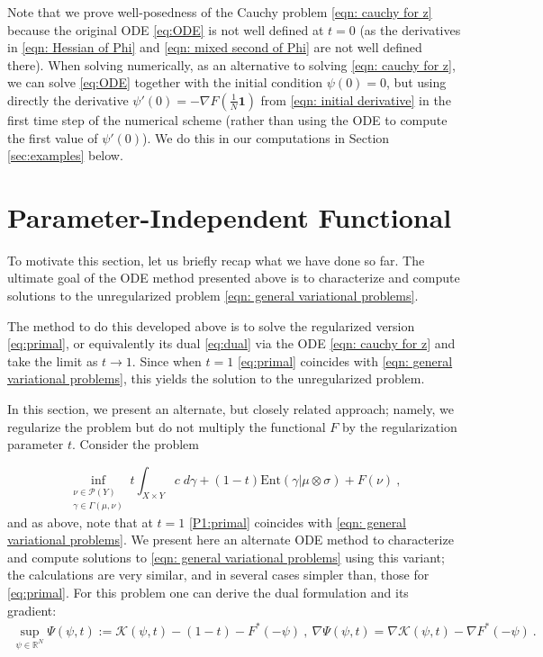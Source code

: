 \documentclass{scrartcl}
\newcommand{\R}{{\mathbb R}}
\theoremstyle{plain}
\theoremstyle{definition}
\begin{document}
Note that we prove well-posedness of the Cauchy problem \eqref{eqn: cauchy for z} because the original ODE \eqref{eq:ODE} is not well defined at $t=0$ (as the derivatives in \eqref{eqn: Hessian of Phi} and \eqref{eqn: mixed second of Phi} are not well defined there).  When solving numerically, as an alternative to solving \eqref{eqn: cauchy for z}, we can solve \eqref{eq:ODE} together with the initial condition $\psi(0)=0$, but using directly the derivative $\psi'(0) = -\nabla F(\frac{1}{N}\mathbf 1)$ from \eqref{eqn: initial derivative} in the first time step of the numerical scheme (rather than using the ODE to compute the first value of $\psi'(0)$).  We do this in our computations in Section \ref{sec:examples} below.

\section{Parameter-Independent Functional}\label{sec:noscale}

To motivate this section, let us briefly recap what we have done so far.  The ultimate goal of the ODE method presented above is to characterize and compute solutions to the unregularized problem \eqref{eqn: general variational problems}.

The method to do this developed above is to solve the regularized version \eqref{eq:primal}, or equivalently its dual \eqref{eq:dual} via the ODE \eqref{eqn: cauchy for z} and take the limit as $t \rightarrow 1$.  Since when $t=1$ \eqref{eq:primal} coincides with \eqref{eqn: general variational problems}, this yields the solution to the unregularized problem.

In this section, we present an alternate, but closely related approach; namely, we regularize the problem but do not multiply the functional $F$ by the regularization parameter $t$.  Consider the problem

\begin{equation}\label{P1:primal}
    \inf_{\substack{\nu\in\mathcal{P}(Y)\\\gamma\in\Gamma(\mu,\nu)}} t\int_{X\times Y} c\;d\gamma +(1-t)\mathrm{Ent}(\gamma|\mu\otimes\sigma)+F(\nu)\ , 
\end{equation}
and as above, note that at $t=1$ \eqref{P1:primal} coincides with \eqref{eqn: general variational problems}.  We present here an alternate ODE method to characterize and compute solutions to \eqref{eqn: general variational problems} using this variant; the calculations are very similar, and in several cases simpler than, those for \eqref{eq:primal}. 
For this problem one can derive the dual formulation and its gradient:
\begin{align}\label{P1:dual}
    \sup_{\psi\in\R^N} \Psi(\psi,t):= \mathcal{K}(\psi,t)-(1-t) -F^*\left(-\psi\right)\ , \ 
    \nabla\Psi(\psi,t) = \nabla\mathcal{K}(\psi,t) - \nabla F^*\left(-\psi\right)\ .
\end{align}
\end{document}
